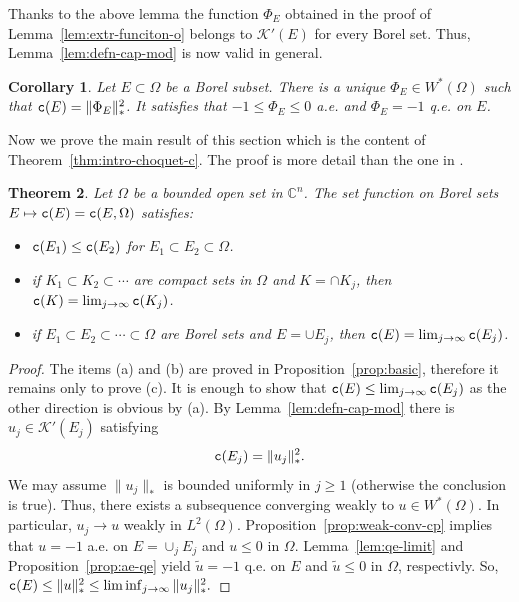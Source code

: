 \documentclass{amsart}
\newcommand{\wt}[1]{\widetilde{#1}}
\newcommand{\tc}{{\tt c}}
\newcommand{\Om}{\Omega}
\newcommand{\bC}{\mathbb{C}}
\newcommand{\cali}[1]{\mathscr{#1}}
\newcommand{\Kc}{\cali{K}}
\newtheorem{thm}{Theorem}
\newtheorem{cor}[thm]{Corollary}
\theoremstyle{definition}
\numberwithin{thm}{section}
\numberwithin{equation}{section}
\renewcommand{\[}{\begin{equation}}
\renewcommand{\]}{\end{equation}}
\begin{document}
Thanks to the above lemma the function $\Phi_E$ obtained  in the proof of Lemma~\ref{lem:extr-funciton-o} belongs to $\Kc'(E)$ for every Borel set. Thus, Lemma~\ref{lem:defn-cap-mod} is now valid in general.

\begin{cor} \label{cor:extr-function} Let $E\subset\Om$ be a Borel  subset. There is a unique $\Phi_E \in W^*(\Om)$ such that 
$\tc (E) = \|\Phi_E\|_*^2$. It satisfies that $-1\leq \Phi_E \leq 0$ a.e. and $\Phi_E=-1$ q.e. on $E$.
\end{cor}

Now we prove  the main result of this section which is the content of Theorem~\ref{thm:intro-choquet-c}. The proof is more detail than the one in \cite[Theorem~30]{Vigny}. 


\begin{thm} \label{thm:choquet-c} Let $\Om$ be a bounded open set in $\bC^n$. The set function on Borel sets $E\mapsto \tc (E)= \tc (E,\Om)$  satisfies:
\begin{itemize}
\item[(a)] $\tc (E_1) \leq \tc (E_2)$ for $E_1\subset E_2\subset \Om$.
\item[(b)] if $K_1 \subset K_2 \subset \cdots$ are compact sets in $\Om$ and $K = \cap K_j$, then $\tc (K) =\lim_{j\to \infty} \tc (K_j)$.
\item[(c)]  if $E_1\subset E_2 \subset \cdots \subset \Om$ are Borel sets and $E= \cup E_j$, then $\tc (E) = \lim_{j\to \infty} \tc (E_j)$.
\end{itemize}
\end{thm}


\begin{proof} The items (a) and (b) are proved in Proposition~\ref{prop:basic}, therefore  it remains only to prove (c). It is enough to show that $\tc (E) \leq \lim_{j\to \infty} \tc (E_j)$ as the other direction is obvious by (a).  By Lemma~\ref{lem:defn-cap-mod} there is  $u_j \in \Kc'(E_j)$  satisfying 
$$
	\tc (E_j) = \|u_j\|_*^2.
$$
We may assume $\|u_j\|_*$ is bounded uniformly in $j\geq 1$ (otherwise the conclusion is true). Thus, there exists a subsequence converging weakly to $u\in W^*(\Om)$. In particular, $u_j \to u$ weakly in $L^2(\Om)$. Proposition~\ref{prop:weak-conv-cp} implies that $u = -1$ a.e. on $E= \cup_j E_j$ and $u\leq 0$ in $\Om$. Lemma~\ref{lem:qe-limit} and Proposition~\ref{prop:ae-qe} yield $\wt u = -1$ q.e. on $E$ and $\wt u \leq 0$ in $\Om$, respectivly. So, $\tc (E) \leq \|u\|_*^2 \leq \liminf_{j\to \infty} \|u_j\|_*^2.$ 
\end{proof}
\end{document}
